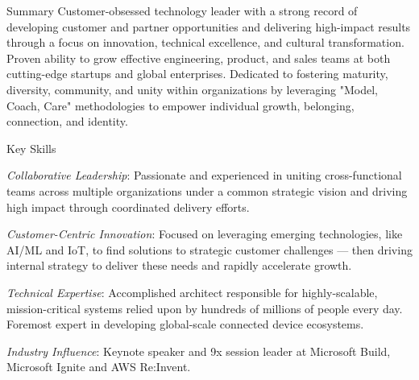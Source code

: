 \documentclass{resume} %
\begin{document}
\vspace{-1em}
\begin{rSection}{Summary}
  Customer-obsessed technology leader with a strong record of developing customer and partner opportunities and delivering high-impact results through a focus on innovation, technical excellence, and cultural transformation. Proven ability to grow effective engineering, product, and sales teams at both cutting-edge startups and global enterprises. Dedicated to fostering maturity, diversity, community, and unity within organizations by leveraging "Model, Coach, Care" methodologies to empower individual growth, belonging, connection, and identity.
\end{rSection}

\begin{rSection}{Key Skills}
  \begin{rSkills}{}
    \setlength\itemsep{-0.5em}
    \item \textit{Collaborative Leadership}: Passionate and experienced in uniting cross-functional teams across multiple organizations under a common strategic vision and driving high impact through coordinated delivery efforts.
    \item \textit{Customer-Centric Innovation}: Focused on leveraging emerging technologies, like AI/ML and IoT, to find solutions to strategic customer challenges --- then driving internal strategy to deliver these needs and rapidly accelerate growth.
    \item \textit{Technical Expertise}: Accomplished architect responsible for highly-scalable, mission-critical systems relied upon by hundreds of millions of people every day. Foremost expert in developing global-scale connected device ecosystems.
    \item \textit{Industry Influence}: Keynote speaker and 9x session leader at Microsoft Build, Microsoft Ignite and AWS Re:Invent.
  \end{rSkills}
\end{rSection}


\end{document}
